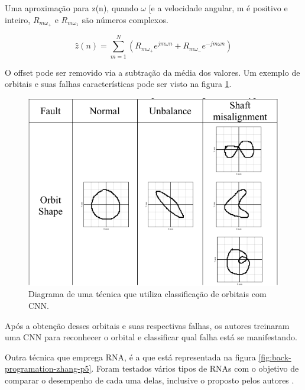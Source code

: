 Uma aproximação para z(n), quando $\omega$ [e a velocidade angular, m é positivo e inteiro, $R_{m\omega_+}$ e $R_{m\omega_1}$ são números
complexos. 

\begin{equation}\label{eq:orbit}
    \hat{z}(n) = \sum_{m=1}^{N}(R_{m\omega_+}e^{jm\omega n}+R_{m\omega_-}e^{-jm\omega n})
\end{equation}

O offset pode ser removido via a subtração da média dos valores. Um exemplo de orbitais e suas falhas características pode ser visto
na figura \ref{fig:orbit_jeong_p3}.


\begin{figure}[H]
    \caption{Diagrama de uma técnica que utiliza classificação de orbitais com CNN.}
    \begin{center}
        \includegraphics[scale=.45]{referencial/img/orbit_jeong_p3.png}
    \end{center}
    \label{fig:orbit_jeong_p3}
\end{figure}

Após a obtenção desses orbitais e suas respectivas falhas, os autores treinaram uma CNN para reconhecer o orbital e classificar qual 
falha está se manifestando.

Outra técnica que emprega RNA, é a que está representada na figura \ref{fig:back-programation-zhang-p5}. Foram
testados vários tipos de RNAs com o objetivo de comparar o desempenho de cada uma delas, inclusive o proposto pelos autores \cite{Zhang2018}.

